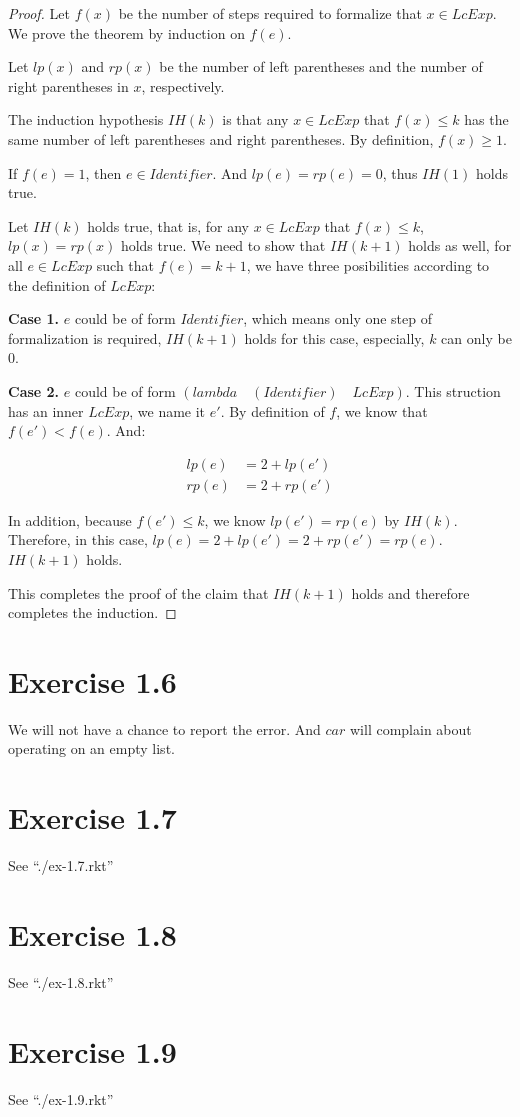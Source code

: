 \documentclass[11pt,a4paper]{article}
\begin{document}
\begin{proof}
    Let $f(x)$ be the number of steps required to formalize that $x \in LcExp$.
    We prove the theorem by induction on $f(e)$.

    Let $lp(x)$ and $rp(x)$ be the number of left parentheses and the number
    of right parentheses in $x$, respectively.

    The induction hypothesis $IH(k)$ is that
    any $x \in LcExp$ that $f(x) \le k$ has the same number of
    left parentheses and right parentheses.  By definition, $f(x) \ge 1$. 

    If $f(e) = 1$, then $e \in Identifier$.
    And $lp(e) = rp(e) = 0$, thus $IH(1)$ holds true.

    Let $IH(k)$ holds true, that is,
    for any $x \in LcExp$ that $f(x) \le k$,
    $lp(x) = rp(x)$ holds true.
    We need to show that $IH(k+1)$ holds as well,
    for all $e \in LcExp$ such that $f(e) = k+1$,
    we have three posibilities according to the definition of $LcExp$:

    \textbf{Case 1.} $e$ could be of form $Identifier$, which means only one
    step of formalization is required, $IH(k+1)$ holds for this case,
    especially, $k$ can only be $0$.

    \textbf{Case 2.} $e$ could be of form
    $(lambda \quad (Identifier) \quad LcExp)$. This struction has
    an inner $LcExp$, we name it $e'$. By definition of $f$,
    we know that $f(e') < f(e)$. And:

    \begin{align*}
        lp(e) & = 2 + lp(e') \\
        rp(e) & = 2 + rp(e')
    \end{align*}

    In addition, because $f(e') \le k$, we know $lp(e') = rp(e)$ by $IH(k)$.
    Therefore, in this case, $lp(e) = 2 + lp(e') = 2 + rp(e') = rp(e)$.
    $IH(k+1)$ holds.

    This completes the proof of the claim that $IH(k+1)$ holds and therefore
    completes the induction.

\end{proof}

\section{Exercise 1.6}

We will not have a chance to report the error.
And $car$ will complain about operating on an empty list.

\section{Exercise 1.7}

See ``./ex-1.7.rkt''

\section{Exercise 1.8}

See ``./ex-1.8.rkt''

\section{Exercise 1.9}

See ``./ex-1.9.rkt''
\end{document}
